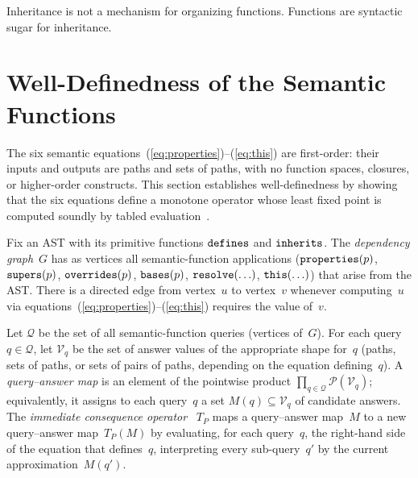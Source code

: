 Inheritance is not a mechanism for organizing functions.
Functions are syntactic sugar for inheritance.




\appendix

\section{Well-Definedness of the Semantic Functions}
\label{app:well-definedness}

The six semantic
equations~(\ref{eq:properties})--(\ref{eq:this}) are
first-order: their inputs and outputs are paths and sets of
paths, with no function spaces, closures, or higher-order
constructs.
This section establishes well-definedness by showing that
the six equations define a monotone operator whose least
fixed point is computed soundly by tabled
evaluation~\cite{tamaki1986-tabled-resolution}.

\begin{definition}\label{def:dependency-graph}
  Fix an AST with its primitive functions $\mathtt{defines}$ and
  $\mathtt{inherits}$.
  The \emph{dependency graph}~$G$ has as vertices all
  semantic-function applications
  ($\mathtt{properties}(p)$, $\mathtt{supers}(p)$, $\mathtt{overrides}(p)$,
    $\mathtt{bases}(p)$, $\mathtt{resolve}(\ldots)$,
  $\mathtt{this}(\ldots)$) that arise from the AST\@.
  There is a directed edge from vertex~$u$ to vertex~$v$
  whenever computing~$u$ via
  equations~(\ref{eq:properties})--(\ref{eq:this})
  requires the value of~$v$.
\end{definition}

\begin{definition}%
  \label{def:tp-operator}
  Let $\mathcal{Q}$ be the set of all
  semantic-function queries
  (vertices of~$G$).
  For each query $q \in \mathcal{Q}$, let
  $\mathcal{V}_q$ be the set of answer values of the
  appropriate shape for~$q$
  (paths, sets of paths, or sets of pairs of paths,
  depending on the equation defining~$q$).
  A \emph{query--answer map} is an element of the
  pointwise product
  $\prod_{q \in \mathcal{Q}} \mathcal{P}(\mathcal{V}_q)$;
  equivalently, it assigns to each query~$q$ a set
  $M(q) \subseteq \mathcal{V}_q$ of candidate answers.
  The \emph{immediate consequence
  operator}~\cite{vanemden1976-predicate-logic-semantics}
  $T_P$ maps a query--answer map~$M$ to a new
  query--answer map~$T_P(M)$ by evaluating, for each
  query~$q$, the right-hand side of the equation that
  defines~$q$, interpreting every sub-query~$q'$ by
  the current approximation~$M(q')$.
\end{definition}

